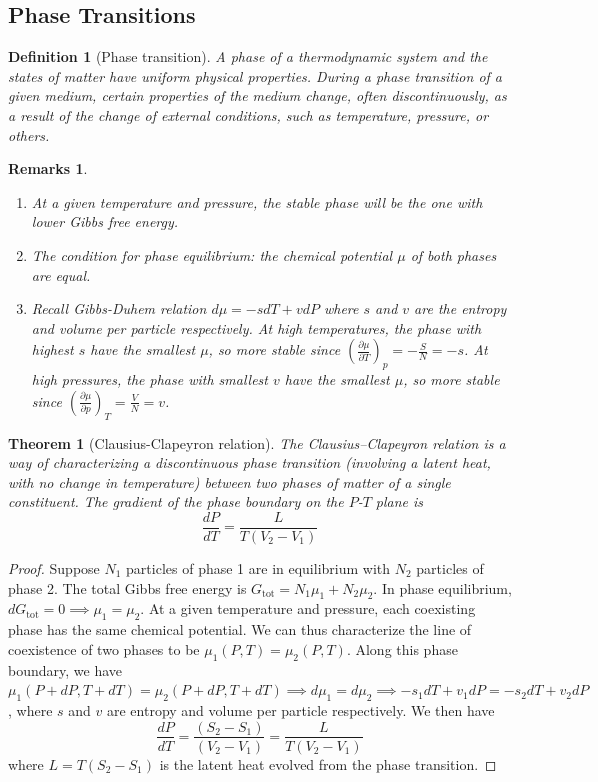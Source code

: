 \documentclass[a4paper]{article}
\newtheorem{remarks}{Remarks}[section]
\theoremstyle{new}
\newtheorem{defi}{Definition}[section]
\newtheorem{thm}{Theorem}[section]
\begin{document}
\subsection{Phase Transitions}
\begin{defi}[Phase transition]
A phase of a thermodynamic system and the states of matter have uniform physical properties. During a phase transition of a given medium, certain properties of the medium change, often discontinuously, as a result of the change of external conditions, such as temperature, pressure, or others.
\end{defi}
\begin{remarks}\leavevmode
\begin{enumerate}
    \item At a given temperature and pressure, the stable phase will be the one with lower Gibbs free energy.
    \item The condition for phase equilibrium: the chemical potential $\mu$ of both phases are equal.
    \item Recall Gibbs-Duhem relation $d\mu=-sdT+vdP$ where $s$ and $v$ are the entropy and volume per particle respectively. At high temperatures, the phase with highest $s$ have the smallest $\mu$, so more stable since $(\frac{\partial\mu}{\partial T})_p=-\frac{S}{N}=-s$. At high pressures, the phase with smallest $v$ have the smallest $\mu$, so more stable since $(\frac{\partial\mu}{\partial p})_T=\frac{V}{N}=v$. 
\end{enumerate}
\end{remarks}
\begin{thm}[Clausius-Clapeyron relation]
The Clausius–Clapeyron relation is a way of characterizing a discontinuous phase transition (involving a latent heat, with no change in temperature) between two phases of matter of a single constituent. The gradient of the phase boundary on the $P$-$T$ plane is
$$\frac{dP}{dT}=\frac{L}{T(V_2-V_1)}$$
\end{thm}
\begin{proof}
Suppose $N_1$ particles of phase 1 are in equilibrium with $N_2$ particles of phase 2. The total Gibbs free energy is $G_{\text{tot}}=N_1\mu_1+N_2\mu_2$. In phase equilibrium, $dG_{\text{tot}}=0\implies\mu_1=\mu_2$. At a given temperature and pressure, each coexisting phase has the same chemical potential. We can thus characterize the line of coexistence of two phases to be $\mu_1(P,T)=\mu_2(P,T)$. Along this phase boundary, we have $\mu_1(P+dP,T+dT)=\mu_2(P+dP,T+dT)\implies d\mu_1=d\mu_2\implies -s_1dT+v_1dP=-s_2dT+v_2dP$, where $s$ and $v$ are entropy and volume per particle respectively. We then have 
$$\frac{dP}{dT}=\frac{(S_2-S_1)}{(V_2-V_1)}=\frac{L}{T(V_2-V_1)}$$
where $L=T(S_2-S_1)$ is the latent heat evolved from the phase transition.
\end{proof}
\end{document}
